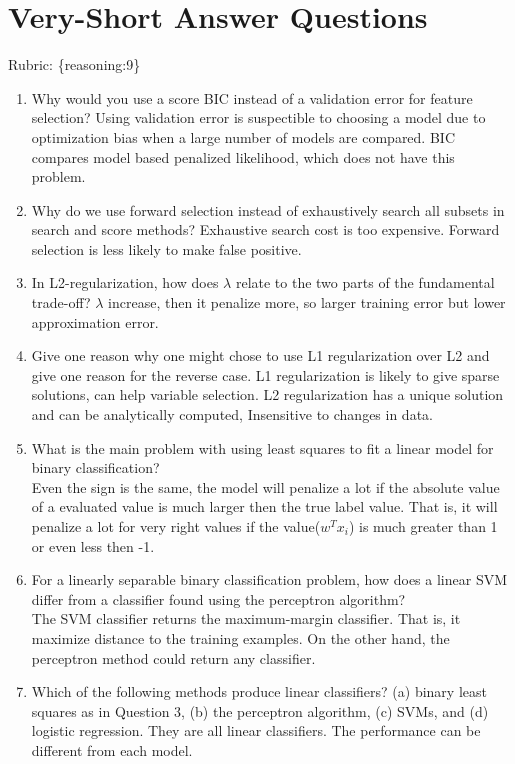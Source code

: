 \documentclass{article}
\def\rubric#1{\gre{Rubric: \{#1\}}}{}
\def\blu#1{{\color{blu}#1}}
\def\gre#1{{\color{gre}#1}}
\def\enum#1{\begin{enumerate}#1\end{enumerate}}
\begin{document}
\section{Very-Short Answer Questions}
\rubric{reasoning:9}

\enum{
\item Why would you use a score BIC instead of a validation error for feature selection?
\blu{Using validation error is suspectible to choosing a model due to optimization bias when a large number of models are compared. BIC compares model based penalized likelihood, which does not have this problem.}
\item Why do we use forward selection instead of exhaustively search all subsets in search and score methods?
\blu{Exhaustive search cost is too expensive. Forward selection is less likely to make false positive.}
\item In L2-regularization, how does $\lambda$ relate to the two parts of the fundamental trade-off?
\blu{$\lambda$ increase, then it penalize more, so larger training error but lower approximation error. }
\item Give one reason why one might chose to use L1 regularization over L2 and give one reason for the reverse case.
\blu{L1 regularization is likely to give sparse solutions, can help variable selection. L2 regularization has a unique solution and can be analytically computed, Insensitive to changes in data. }
\item What is the main problem with using least squares to fit a linear model for binary classification?\\
\blu{Even the sign is the same, the model will penalize a lot if the absolute value of a evaluated value is much larger then the true label value. That is, it will penalize a lot for very right values if the value($w^Tx_i$) is much greater than 1 or even less then -1. }
\item For a linearly separable binary classification problem, how does a linear SVM differ from a classifier found using the perceptron algorithm?\\
\blu{The SVM classifier returns the maximum-margin classifier. That is, it maximize distance to the training examples. On the other hand, the perceptron method could return any classifier.}
\item Which of the following methods produce linear classifiers? (a) binary least squares as in Question 3, (b) the perceptron algorithm, (c) SVMs, and (d) logistic regression.
\blu{They are all linear classifiers. The performance can be different from each model.}
}
\end{document}
